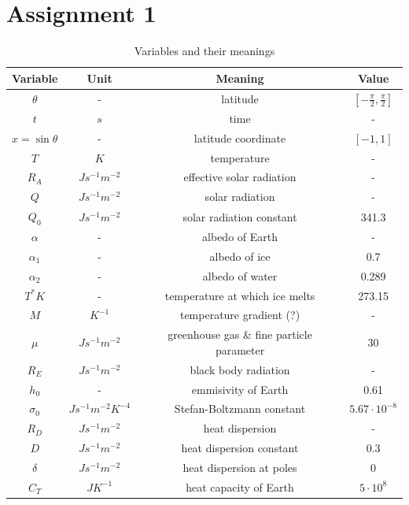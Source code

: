 \section{Assignment 1}

\begin{table}[H]
    \centering
    \begin{tabular}{|c|c|c|c|}
        \hline
        Variable & Unit &  Meaning & Value\\
        \hline
        $\theta$ & - & latitude & $[-\frac{\pi}{2}, \frac{\pi}{2}]$\\
        $t $ & $s$ & time & -\\
        $x = \sin \theta$ & -  & latitude coordinate & $[-1, 1]$\\
        $T $ & $K$ & temperature & -\\
        $R_A $ & $J s^{-1} m^{-2}$ & effective solar radiation & - \\
        $Q $ & $J s^{-1} m^{-2}$ & solar radiation & -\\
        $Q_0 $ & $J s^{-1} m^{-2}$ & solar radiation constant & 341.3\\
        $\alpha$ & - & albedo of Earth & -\\
        $\alpha_1$ & - & albedo of ice & 0.7\\
        $\alpha_2$ & - & albedo of water & 0.289\\
        $T^{*} K$ & - & temperature at which ice melts & 273.15\\
        $M$ & $K^{-1}$ & temperature gradient (?) & -\\
        $\mu $ & $J s^{-1} m^{-2}$ & greenhouse gas \& fine particle parameter & 30\\
        $R_E $ & $J s^{-1} m^{-2}$ & black body radiation & -\\
        $h_0$ & - & emmisivity of Earth & 0.61\\
        $\sigma_0 $ & $J s^{-1} m^{-2} K^{-4}$ & Stefan-Boltzmann constant & $5.67 \cdot 10^{-8}$\\
        $R_D $ & $J s^{-1} m^{-2}$ & heat dispersion & -\\
        $D $ & $J s^{-1} m^{-2}$ & heat dispersion constant & 0.3\\
        $\delta $ & $J s^{-1} m^{-2}$ & heat dispersion at poles & 0\\
        $C_T $ & $J K^{-1}$  & heat capacity of Earth & $5 \cdot 10^{8}$\\
        \hline
    \end{tabular}
    \caption{Variables and their meanings}
    \label{tab:vars}
\end{table}

